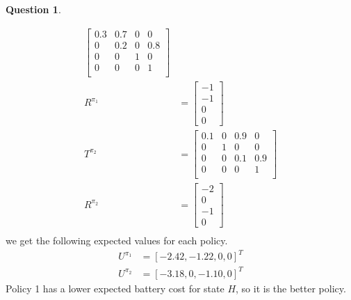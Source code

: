 \documentclass{article}
\theoremstyle{definition}
\newtheorem{question}[thm]{Question}
\begin{document}
\begin{question}
\begin{enumerate}[label=\alph*)]
\begin{align*}
\begin{bmatrix}
                            0.3 & 0.7 & 0 & 0\\
                            0 & 0.2 & 0 & 0.8\\
                            0 & 0 & 1 & 0\\
                            0 & 0 & 0 & 1\\
                         \end{bmatrix}\\
            R^{\pi_1} &= 
            \begin{bmatrix}
                -1\\
                -1\\
                0\\
                0
            \end{bmatrix}\\
             T^{\pi_2} &= \begin{bmatrix}
                            0.1 & 0 & 0.9 & 0\\
                            0 & 1 & 0 & 0\\
                            0 & 0 & 0.1 & 0.9\\
                            0 & 0 & 0 & 1\\
                         \end{bmatrix}\\
            R^{\pi_2} &= 
            \begin{bmatrix}
                -2\\
                0\\
                -1\\
                0
            \end{bmatrix}\\
        \end{align*}
        we get the following expected values for each policy.
        \begin{align*}
            U^{\pi_1} &= [-2.42,-1.22,0,0]^T\\
            U^{\pi_2} &= [-3.18,0,-1.10,0]^T
        \end{align*}
        Policy 1 has a lower expected battery cost for state $H$, so it is the better policy.
    \end{enumerate}
\end{question}



\clearpage
\end{document}
